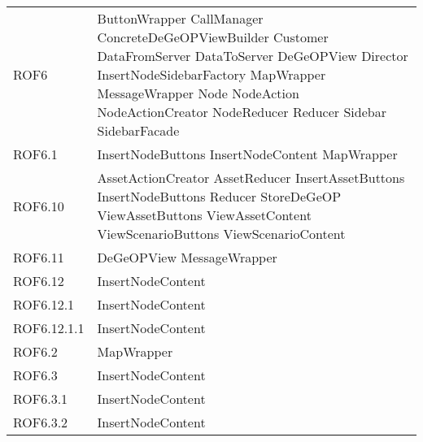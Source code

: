 \begin{longtable}{p{2.5cm}!{\VRule[1pt]}p{5cm}}
		ROF6 & ButtonWrapper \newline CallManager \newline ConcreteDeGeOPViewBuilder \newline Customer \newline DataFromServer \newline DataToServer \newline DeGeOPView \newline Director \newline InsertNodeSidebarFactory \newline MapWrapper \newline MessageWrapper \newline Node \newline NodeAction \newline NodeActionCreator \newline NodeReducer \newline Reducer \newline Sidebar \newline SidebarFacade\\
		ROF6.1 & InsertNodeButtons \newline InsertNodeContent \newline MapWrapper\\
		ROF6.10 & AssetActionCreator \newline AssetReducer \newline InsertAssetButtons \newline InsertNodeButtons \newline Reducer \newline StoreDeGeOP \newline ViewAssetButtons \newline ViewAssetContent \newline ViewScenarioButtons \newline ViewScenarioContent\\
		ROF6.11 & DeGeOPView \newline MessageWrapper\\
		ROF6.12 & InsertNodeContent\\
		ROF6.12.1 & InsertNodeContent\\
		ROF6.12.1.1 & InsertNodeContent\\
		ROF6.2 & MapWrapper\\
		ROF6.3 & InsertNodeContent\\
		ROF6.3.1 & InsertNodeContent\\
		ROF6.3.2 & InsertNodeContent\\

\end{longtable}
